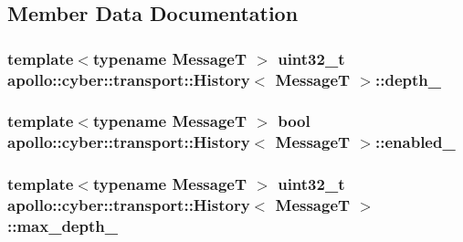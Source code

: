 \subsection{Member Data Documentation}
\hypertarget{classapollo_1_1cyber_1_1transport_1_1History_af3e8c06815f54811dbfd8c9ca57a9207}{
\subsubsection[{depth\-\_\-}]{\setlength{\rightskip}{0pt plus 5cm}template$<$typename Message\-T $>$ uint32\-\_\-t {\bf apollo\-::cyber\-::transport\-::\-History}$<$ Message\-T $>$\-::depth\-\_\-\hspace{0.3cm}{\ttfamily [private]}}}\label{classapollo_1_1cyber_1_1transport_1_1History_af3e8c06815f54811dbfd8c9ca57a9207}
\hypertarget{classapollo_1_1cyber_1_1transport_1_1History_a069e631128a251e29a0c5aa226bf6cf0}{
\subsubsection[{enabled\-\_\-}]{\setlength{\rightskip}{0pt plus 5cm}template$<$typename Message\-T $>$ bool {\bf apollo\-::cyber\-::transport\-::\-History}$<$ Message\-T $>$\-::enabled\-\_\-\hspace{0.3cm}{\ttfamily [private]}}}\label{classapollo_1_1cyber_1_1transport_1_1History_a069e631128a251e29a0c5aa226bf6cf0}
\hypertarget{classapollo_1_1cyber_1_1transport_1_1History_aa9abd9c1faa847d3f1ab18be1915d5a2}{
\subsubsection[{max\-\_\-depth\-\_\-}]{\setlength{\rightskip}{0pt plus 5cm}template$<$typename Message\-T $>$ uint32\-\_\-t {\bf apollo\-::cyber\-::transport\-::\-History}$<$ Message\-T $>$\-::max\-\_\-depth\-\_\-\hspace{0.3cm}{\ttfamily [private]}}}\label{classapollo_1_1cyber_1_1transport_1_1History_aa9abd9c1faa847d3f1ab18be1915d5a2}
